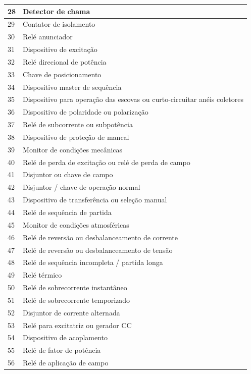 \documentclass[a5paper,english,spanish,brazil]{ufsc-thesis}
\begin{document}
\begin{longtable}{|l|p{}|}
  28 & Detector de chama \\ \hline
  29 & Contator de isolamento \\ \hline
  30 & Relé anunciador \\ \hline
  31 & Dispositivo de excitação  \\ \hline
  32 & Relé direcional de potência \\ \hline
  33 & Chave de posicionamento \\ \hline
  34 & Dispositivo master de sequência \\ \hline
  35 & Dispositivo para operação das escovas ou curto-circuitar anéis coletores \\ \hline
  36 & Dispositivo de polaridade ou polarização \\ \hline
  37 & Relé de subcorrente ou subpotência \\ \hline
  38 & Dispositivo de proteção de mancal \\ \hline
  39 & Monitor de condições mecânicas \\ \hline
  40 & Relé de perda de excitação ou relé de perda de campo \\ \hline
  41 & Disjuntor ou chave de campo \\ \hline
  42 & Disjuntor / chave de operação normal \\ \hline
  43 & Dispositivo de transferência ou seleção manual \\ \hline
  44 & Relé de sequência de partida  \\ \hline
  45 & Monitor de condições atmosféricas \\ \hline
  46 & Relé de reversão ou desbalanceamento de corrente \\ \hline
  47 & Relé de reversão ou desbalanceamento de tensão \\ \hline
  48 & Relé de sequência incompleta / partida longa \\ \hline
  49 & Relé térmico \\ \hline
  50 & Relé de sobrecorrente instantâneo \\ \hline
  51 & Relé de sobrecorrente temporizado \\ \hline
  52 & Disjuntor de corrente alternada \\ \hline
  53 & Relé para excitatriz ou gerador CC \\ \hline
  54 & Dispositivo de acoplamento \\ \hline
  55 & Relé de fator de potência \\ \hline
  56 & Relé de aplicação de campo \\ \hline

\end{longtable}
\end{document}
